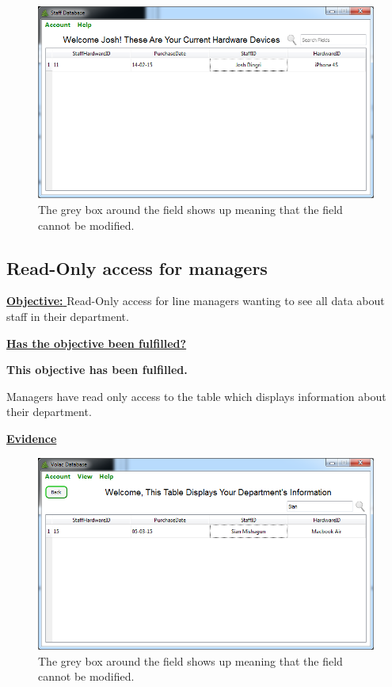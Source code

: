 \begin{figure}[H]
    \includegraphics[width=\textwidth]{./Evaluation/Images/readonlystaff.png}
    \caption{The grey box around the field shows up meaning that the field cannot be modified.} 
\end{figure}



\subsection{Read-Only access for managers}

\underline{\textbf{Objective:} } Read-Only access for line managers wanting to see all data about staff in their department.

\underline{\textbf{Has the objective been fulfilled?}}

\textbf{This objective has been fulfilled.}

Managers have read only access to the table which displays information about their department.

\underline{\textbf{Evidence}}

\begin{figure}[H]
    \includegraphics[width=\textwidth]{./Evaluation/Images/readonlymanager.png}
    \caption{The grey box around the field shows up meaning that the field cannot be modified.} 
\end{figure}




